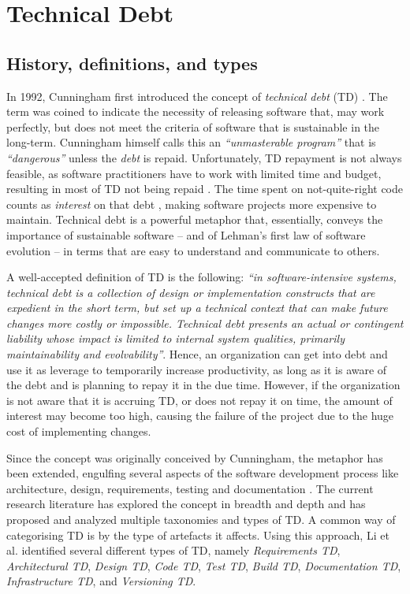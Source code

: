 \section{Technical Debt}
\subsection{History, definitions, and types}
In 1992, Cunningham first introduced the concept of \emph{technical debt} (TD) \cite{Cunningham1992}. 
The term was coined to indicate the necessity of releasing software that, may work perfectly, but does not meet the criteria of software that is sustainable in the long-term. 
Cunningham himself calls this an \emph{``unmasterable program''} that is \emph{``dangerous''} unless the \emph{debt} is repaid.
Unfortunately, TD repayment is not always feasible, as software practitioners have to work with limited time and budget, resulting in most of TD not being repaid \cite{Digkas2018}.
The time spent on not-quite-right code counts as \emph{interest} on that debt \cite{Cunningham1992}, making software projects more expensive to maintain.
Technical debt is a powerful metaphor that, essentially, conveys the importance of sustainable software -- and of Lehman's first law of software evolution -- in terms that are easy to understand and communicate to others. 


A well-accepted definition of TD is the following: 
\emph{``in software-intensive systems, technical debt is a collection of design or implementation constructs that are expedient in the short term, but set up a technical context that can make future changes more costly or impossible. Technical debt presents an actual or contingent liability whose impact is limited to internal system qualities, primarily maintainability and evolvability''}\cite{Avgeriou2016}. 
Hence, an organization can get into debt and use it as leverage to temporarily increase productivity, as long as it is aware of the debt and is planning to repay it in the due time.
However, if the organization is not aware that it is accruing TD, or does not repay it on time, the amount of interest may become too high, causing the failure of the project due to the huge cost of implementing changes.

Since the concept was originally conceived by Cunningham, the metaphor has been extended, engulfing several aspects of the software development process like architecture, design, requirements, testing and documentation \cite{Brown2010}.
The current research literature has explored the concept in breadth and depth and has proposed and analyzed multiple taxonomies and types of TD.
A common way of categorising TD is by the type of artefacts it affects. Using this approach, Li et al. \cite{Li2015} identified several different types of TD, namely \emph{Requirements TD}, \emph{Architectural TD}, \emph{Design TD}, \emph{Code TD}, \emph{Test TD}, \emph{Build TD}, \emph{Documentation TD}, \emph{Infrastructure TD}, and \emph{Versioning TD}.

